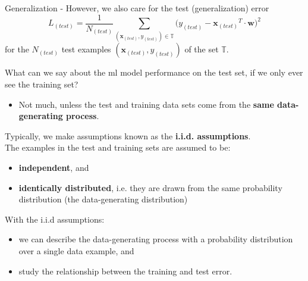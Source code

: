 \begin{frame}[t,allowframebreaks]{Generalization -}
    However, we also care for the test (generalization) error
    \begin{equation}
        L_{(test)} = \frac{1}{N_{(test)}} 
        \sum_{({\mathbf x_{(test)}},y_{(test)})  \in \mathbb{T}}
        \Big( y_{(test)} - {\mathbf x_{(test)}}^T \cdot {\mathbf w} \Big)^2
    \end{equation}        
    for the $N_{(test)}$ test examples $({\mathbf x_{(test)}},y_{(test)})$ 
    of the set $\mathbb{T}$.

    \framebreak


    What can we say about the \gls{ml} model performance on the test set,
    if we only ever see the training set?
    \begin{itemize}
        \item
        Not much, unless the test and training data sets come from the 
        {\bf same data-generating process}.    
    \end{itemize}
    \vspace{0.2cm}   
    Typically, we make assumptions known as the {\bf i.i.d. assumptions}.\\
    \vspace{0.2cm}
    The examples in the test and training sets are assumed to be:
    \begin{itemize}
        \item {\bf independent}, and
        \item {\bf identically distributed}, 
        i.e. they are drawn from the same probability distribution 
        (the data-generating distribution)
    \end{itemize}
    \vspace{0.2cm}
    With the i.i.d assumptions:
    \begin{itemize}
        \item
        we can describe the data-generating process
        with a probability distribution over a single data example, and
        \item
        study the relationship between the training and test error.
    \end{itemize}

\end{frame}
